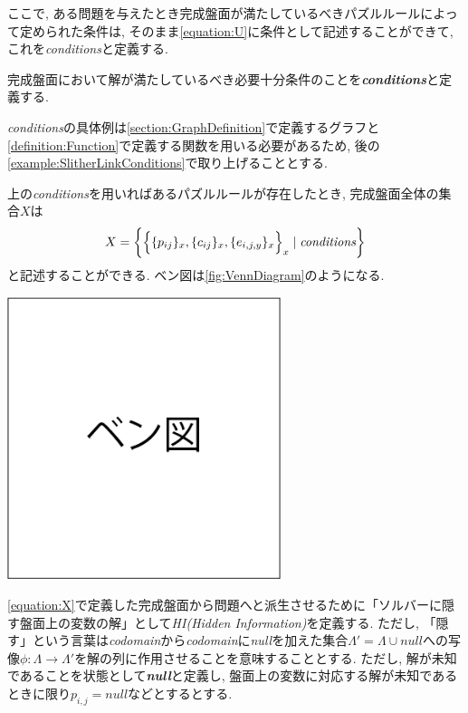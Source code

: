 ここで, ある問題を与えたとき完成盤面が満たしているべきパズルルールによって定められた条件は, そのまま\cref{equation:U}に条件として記述することができて, これを\textit{conditions}と定義する.
\begin{definition}\label{definition:Conditions}
  完成盤面において解が満たしているべき必要十分条件のことを\textbf{\textit{conditions}}と定義する.
\end{definition}
\textit{conditions}の具体例は\cref{section:GraphDefinition}で定義するグラフと\cref{definition:Function}で定義する関数を用いる必要があるため, 後の\cref{example:SlitherLinkConditions}で取り上げることとする.

上の\textit{conditions}を用いればあるパズルルールが存在したとき, 完成盤面全体の集合$X$は
\begin{equation}\label{equation:X}
  X=\biggl\{\Bigl\{\{p_{ij}\}_x,\{c_{ij}\}_x,\{e_{i,j,y}\}_x\Bigr\}_x\mid \rm{\textit{conditions}}\biggr\}
\end{equation}
と記述することができる. ベン図は\cref{fig:VennDiagram}のようになる.

\begin{clearpagefigure}
  \includegraphics[width=8cm,clip]{fig/vennDiagram.png}
  \caption{}
  \label{fig:VennDiagram}
\end{clearpagefigure}

\cref{equation:X}で定義した完成盤面から問題へと派生させるために「ソルバーに隠す盤面上の変数の解」として\textit{HI(Hidden Information)}を定義する.
ただし, 「隠す」という言葉は\textit{codomain}から\textit{codomain}に\textit{null}を加えた集合$\Lambda'=\Lambda\cup \textit{null}$への写像$\phi\colon \Lambda \longrightarrow \Lambda'$を解の列に作用させることを意味することとする.
ただし, 解が未知であることを状態として\textbf{\textit{null}}と定義し, 盤面上の変数に対応する解が未知であるときに限り$p_{i,j}=\textit{null}$などとするとする.

